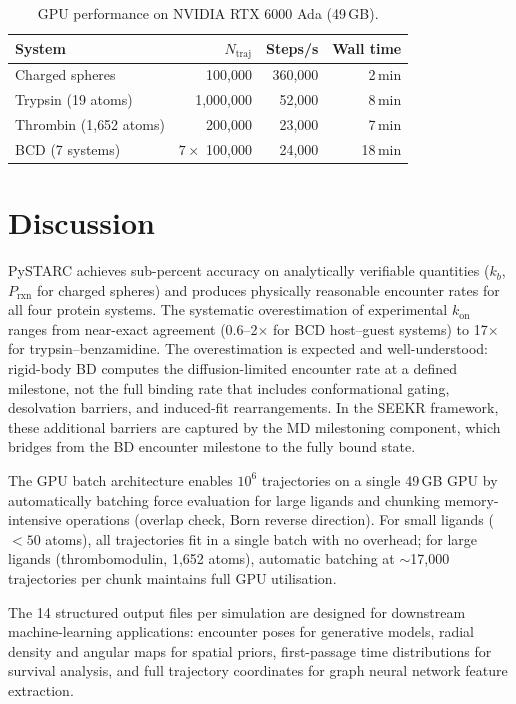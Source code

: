 \documentclass[journal=jctcce,manuscript=article,layout=twocolumn]{achemso}
\newcommand{\kon}{k_{\mathrm{on}}}
\newcommand{\Prxn}{P_{\mathrm{rxn}}}
\begin{document}
\begin{table}[h]
\caption{GPU performance on NVIDIA RTX 6000 Ada (49\,GB).}
\label{tab:perf}
\footnotesize
\begin{tabular}{lrrr}
\toprule
System & $N_\mathrm{traj}$ & Steps/s & Wall time \\
\midrule
Charged spheres & 100{,}000 & 360{,}000 & 2\,min \\
Trypsin (19 atoms) & 1{,}000{,}000 & 52{,}000 & 8\,min \\
Thrombin (1{,}652 atoms) & 200{,}000 & 23{,}000 & 7\,min \\
BCD (7 systems) & $7 \times$ 100{,}000 & 24{,}000 & 18\,min \\
\bottomrule
\end{tabular}
\end{table}


\section{Discussion}
\label{sec:discussion}

PySTARC achieves sub-percent accuracy on analytically verifiable
quantities ($k_b$, $\Prxn$ for charged spheres) and produces
physically reasonable encounter rates for all four protein systems.
The systematic overestimation of experimental $\kon$ ranges from
near-exact agreement (0.6--2$\times$ for BCD host--guest systems)
to 17$\times$ for trypsin--benzamidine.
The overestimation is expected and well-understood: rigid-body BD
computes the diffusion-limited encounter rate at a defined milestone,
not the full binding rate that includes conformational gating,
desolvation barriers, and induced-fit rearrangements.
In the SEEKR framework, these additional barriers are captured by
the MD milestoning component, which bridges from the BD encounter
milestone to the fully bound state.

The GPU batch architecture enables $10^6$ trajectories on a single
49\,GB GPU by automatically batching force evaluation for large
ligands and chunking memory-intensive operations (overlap check,
Born reverse direction).
For small ligands ($<50$ atoms), all trajectories fit in a single
batch with no overhead; for large ligands (thrombomodulin, 1{,}652
atoms), automatic batching at $\sim$17{,}000 trajectories per
chunk maintains full GPU utilisation.

The 14 structured output files per simulation are designed for
downstream machine-learning applications: encounter poses for
generative models, radial density and angular maps for spatial
priors, first-passage time distributions for survival analysis,
and full trajectory coordinates for graph neural network feature
extraction.
\end{document}
